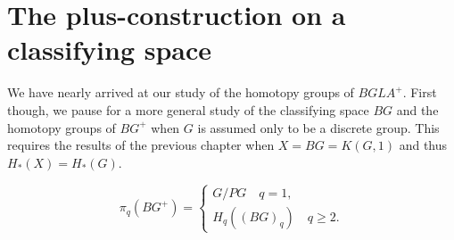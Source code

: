 \chapter{The plus-construction on a classifying space} %
\label{cha:8the_plus_construction_on_a_classifying_space}
We have nearly arrived at our study of the homotopy groups of $BGLA^+$. First though, we pause for a more general study of the classifying space $BG$ and the homotopy groups of $BG^+$ when $G$ is assumed only to be a discrete group. This requires the results of the previous chapter when $X = BG = K(G, 1)$ and thus $H_*(X) = H_*(G)$.
\begin{theorem}
\begin{equation*}
\pi_q(BG^+)=
  \begin{cases}
G/PG \quad q=1, \\
H_q((BG)_q) \quad q\geqslant 2.
\end{cases}
\end{equation*}
\end{theorem}
